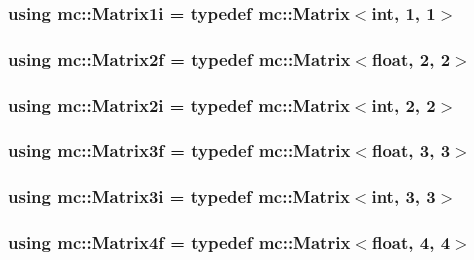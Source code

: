 \subsubsection[{\texorpdfstring{Matrix1i}{Matrix1i}}]{\setlength{\rightskip}{0pt plus 5cm}using {\bf mc\+::\+Matrix1i} = typedef {\bf mc\+::\+Matrix}$<$int, 1, 1$>$}\hypertarget{namespacemc_abd3b65ef804598d2bcb93051d7fbcc9e}{}\label{namespacemc_abd3b65ef804598d2bcb93051d7fbcc9e}
\subsubsection[{\texorpdfstring{Matrix2f}{Matrix2f}}]{\setlength{\rightskip}{0pt plus 5cm}using {\bf mc\+::\+Matrix2f} = typedef {\bf mc\+::\+Matrix}$<$float, 2, 2$>$}\hypertarget{namespacemc_a7f5fd82341ebac4add0554139e58ec61}{}\label{namespacemc_a7f5fd82341ebac4add0554139e58ec61}
\subsubsection[{\texorpdfstring{Matrix2i}{Matrix2i}}]{\setlength{\rightskip}{0pt plus 5cm}using {\bf mc\+::\+Matrix2i} = typedef {\bf mc\+::\+Matrix}$<$int, 2, 2$>$}\hypertarget{namespacemc_a3d6ef8ef71b722b552a14b3859cca75f}{}\label{namespacemc_a3d6ef8ef71b722b552a14b3859cca75f}
\subsubsection[{\texorpdfstring{Matrix3f}{Matrix3f}}]{\setlength{\rightskip}{0pt plus 5cm}using {\bf mc\+::\+Matrix3f} = typedef {\bf mc\+::\+Matrix}$<$float, 3, 3$>$}\hypertarget{namespacemc_a142a9fb1b5ed3503c520caca5924389e}{}\label{namespacemc_a142a9fb1b5ed3503c520caca5924389e}
\subsubsection[{\texorpdfstring{Matrix3i}{Matrix3i}}]{\setlength{\rightskip}{0pt plus 5cm}using {\bf mc\+::\+Matrix3i} = typedef {\bf mc\+::\+Matrix}$<$int, 3, 3$>$}\hypertarget{namespacemc_af5dbdaac2f76c49ea96bafaf8743298e}{}\label{namespacemc_af5dbdaac2f76c49ea96bafaf8743298e}
\subsubsection[{\texorpdfstring{Matrix4f}{Matrix4f}}]{\setlength{\rightskip}{0pt plus 5cm}using {\bf mc\+::\+Matrix4f} = typedef {\bf mc\+::\+Matrix}$<$float, 4, 4$>$}\hypertarget{namespacemc_afd32b9ea49ccd962bb337dc71450595b}{}\label{namespacemc_afd32b9ea49ccd962bb337dc71450595b}
